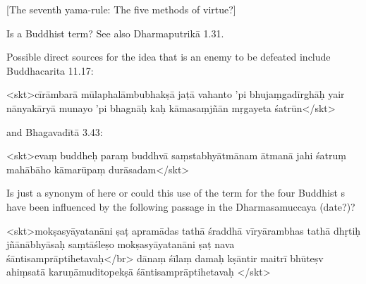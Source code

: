\begin{center}
{{[The seventh yama-rule: The five methods of virtue?]}}
\end{center}









{ Is  a Buddhist term? See also Dharmaputrikā 1.31. }





{ Possible direct sources for the idea that  is an enemy to be defeated include                 Buddhacarita 11.17: 

         <skt>cīrāmbarā mūlaphalāmbubhakṣā
               jaṭā vahanto 'pi bhujaṃgadīrghāḥ\danda
               yair nānyakāryā munayo 'pi bhagnāḥ
               kaḥ kāmasaṃjñān mṛgayeta śatrūn\twodanda</skt> 

          and Bhagavadītā 3.43:         

         <skt>evaṃ buddheḥ paraṃ buddhvā saṃstabhyātmānam ātmanā\danda
              jahi śatruṃ mahābāho kāmarūpaṃ durāsadam\twodanda</skt>  }





{ Is  just a synonym of  here or                  could this use of the term  for the four Buddhist                  s have been influenced by the following passage in the Dharmasamuccaya (date?)?         

                         <skt>mokṣasyāyatanāni ṣaṭ\danda
                         apramādas tathā śraddhā vīryārambhas tathā dhṛtiḥ\danda
                         jñānābhyāsaḥ saṃtāśleṣo mokṣasyāyatanāni ṣaṭ\twodanda
                         nava śāntisamprāptihetavaḥ\danda</br>                         dānaṃ śīlaṃ damaḥ kṣāntir maitrī bhūteṣv ahiṃsatā\danda
                         karuṇāmuditopekṣā śāntisamprāptihetavaḥ\twodanda
</skt>  }





